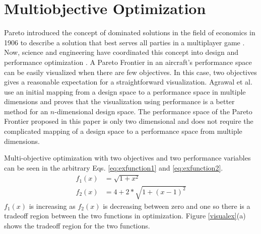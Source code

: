 \section{Multiobjective Optimization}
Pareto introduced the concept of dominated solutions in the field of economics in 1906 to describe a solution that best serves all parties in a multiplayer game \cite{paretomanual}. Now, science and engineering have coordinated this concept into design and performance optimization \cite{surveyMarler}. A Pareto Frontier in an aircraft's performance space can be easily visualized when there are few objectives. In this case, two objectives gives a reasonable expectation for a straightforward visualization. Agrawal et al. \cite{MultiobjectiveVisualization} use an initial mapping from a design space to a performance space in multiple dimensions and proves that the visualization using performance is a better method for an $n$-dimensional design space. The performance space of the Pareto Frontier proposed in this paper is only two dimensional and does not require the complicated mapping of a design space to a performance space from multiple dimensions.\par
Multi-objective optimization with two objectives and two performance variables can be seen in the arbitrary Eqs. \ref{eq:exfunction1} and \ref{eq:exfunction2}.
\begin{align}
    f_1(x) &= \sqrt{1+x^2}\label{eq:exfunction1}\\
    f_2(x) &= 4+2*\sqrt{1+(x-1)^2}
    \label{eq:exfunction2}
\end{align}
$f_1(x)$ is increasing as $f_2(x)$ is decreasing between zero and one so there is a tradeoff region between the two functions in optimization. Figure \ref{visualex}(a) shows the tradeoff region for the two functions.


